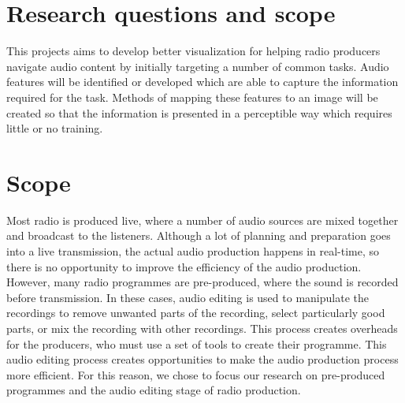 \section{Research questions and scope}\label{sec:intro-questions}
This projects aims to develop better visualization for helping radio producers
navigate audio content by initially targeting a number of common tasks. Audio
features will be identified or developed which are able to capture the
information required for the task. Methods of mapping these features to an
image will be created so that the information is presented in a perceptible way
which requires little or no training. 

\section{Scope}



Most radio is produced live, where a number of audio sources are mixed together and broadcast to the listeners.
Although a lot of planning and preparation goes into a live transmission, the actual audio production happens in
real-time, so there is no opportunity to improve the efficiency of the audio production. However, many radio programmes
are pre-produced, where the sound is recorded before transmission.  In these cases, audio editing is used to manipulate
the recordings to remove unwanted parts of the recording, select particularly good parts, or mix the recording with
other recordings. This process creates overheads for the producers, who must use a set of tools to create their
programme. This audio editing process creates opportunities to make the audio production process more efficient. For
this reason, we chose to focus our research on pre-produced programmes and the audio editing stage of radio production.


